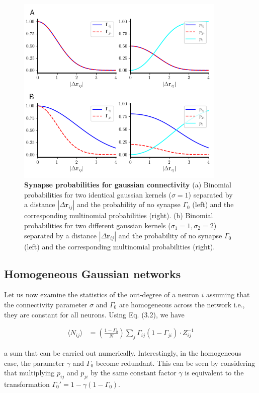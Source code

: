 \documentclass{ucetd}
\begin{document}
\begin{figure}[t!]
\centering
\includegraphics[width=100mm]{figure-7}
\caption{\textbf{Synapse probabilities for gaussian connectivity} (a) Binomial probabilities for two identical gaussian kernels ($\sigma=1$) separated by a distance $|\Delta\mathbf{r}_{ij}|$ and the probability of no synapse $\Gamma_{0}$ (left) and the corresponding multinomial probabilities (right). (b) Binomial probabilities for two different gaussian kernels ($\sigma_{1}=1, \sigma_{2}=2$) separated by a distance $|\Delta\mathbf{r}_{ij}|$ and the probability of no synapse $\Gamma_{0}$ (left) and the corresponding multinomial probabilities (right). }
\end{figure}



\subsection{Homogeneous Gaussian networks}

Let us now examine the statistics of the out-degree of a neuron $i$ assuming that the connectivity parameter $\sigma$ and $\Gamma_{0}$ are homogeneous across the network i.e., they are constant for all neurons. Using Eq. (3.2), we have

\begin{align}
\langle N_{ij} \rangle &= \left(\frac{1-\Gamma_{0}}{N}\right)\sum_{j} \Gamma_{ij}(1-\Gamma_{ji})\cdot Z_{ij}^{-1}
\end{align}

a sum that can be carried out numerically. Interestingly, in the homogeneous case, the parameter $\gamma$ and $\Gamma_{0}$ become redundant. This can be seen by considering that multiplying $p_{ij}$ and $p_{ji}$ by the same constant factor $\gamma$ is equivalent to the transformation $\Gamma_{0}' = 1-\gamma(1-\Gamma_{0})$. 
\end{document}
